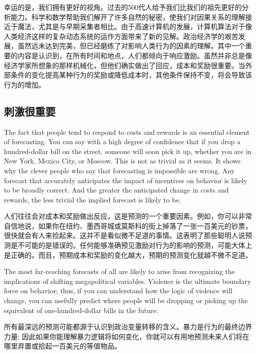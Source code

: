 \begin{Parallel}{97mm}{72mm}
  \ParallelRText
  {幸运的是，我们拥有更好的视角。过去的500代人给予我们比我们的祖先更好的分析能力。科学和数学帮助我们解开了许多自然的秘密，使我们对因果关系的理解接近于魔法，尤其是与早期采集者相比。由于高速计算机的发展，计算机算法对于像人类经济这样的复杂动态系统的运作方面带来了新的见解。政治经济学的艰苦发展，虽然远未达到完美，但已经磨练了对影响人类行为的因素的理解。其中一个重要的内容是认识到，在所有时间和地点，人们都倾向于响应激励。虽然并非总是像经济学家所想象的那样机械化，但他们确实做出了回应，成本和奖励很重要。当外部条件的变化提高某种行为的奖励或降低成本时，其他条件保持不变，将会导致该行为的增加。}
  \ParallelPar

  \subsection{刺激很重要}

  \ParallelLText
  {The fact that people tend to respond to costs and rewards is an essential element of forecasting. You can say with a high degree of confidence that if you drop a hundred-dollar bill on the street, someone will soon pick it up, whether you are in New York, Mexico City, or Moscow. This is not as trivial as it seems. It shows why the clever people who say that forecasting is impossible are wrong. Any forecast that accurately anticipates the impact of incentives on behavior is likely to be broadly correct. And the greater the anticipated change in costs and rewards, the less trivial the implied forecast is likely to be.}
  
  \ParallelRText
  {人们往往会对成本和奖励做出反应，这是预测的一个重要因素。例如，你可以非常自信地说，如果你在纽约、墨西哥城或莫斯科的街上掉落了一张一百美元的钞票，很快就会有人来捡起来。这并不是看似微不足道的事情。这表明了那些聪明人说预测是不可能的是错误的。任何能够准确预见激励对行为的影响的预测，可能大体上是正确的。而且，预期成本和奖励的变化越大，预期的预测变化就越不微不足道。
  }
  \ParallelPar


  \ParallelLText
  {The most far-reaching forecasts of all are likely to arise from recognizing the implications of shifting megapolitical variables. Violence is the ultimate boundary force on behavior; thus, if you can understand how the logic of violence will change, you can usefully predict where people will be dropping or picking up the equivalent of one-hundred-dollar bills in the future.}
  
  \ParallelRText
  {所有最深远的预测可能都源于认识到政治变量转移的含义。暴力是行为的最终边界力量; 因此如果你能理解暴力逻辑将如何变化，你就可以有用地预测未来人们将在哪里弃置或拾起一百美元的等值物品。}
  \ParallelPar




\end{Parallel}
